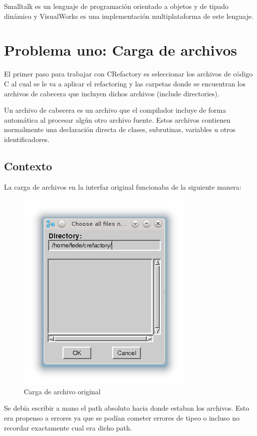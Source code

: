 \documentclass[a4paper,oneside,12pt]{article}
\begin{document}
Smalltalk es un lenguaje de programaci\'on orientado a objetos y de tipado din\'amico y VisualWorks es una implementaci\'on multiplataforma de este lenguaje.

\section{Problema uno: Carga de archivos}

El primer paso para trabajar con CRefactory es seleccionar los archivos de c\'odigo C al cual se le va a aplicar el refactoring y las carpetas donde se encuentran los archivos de cabecera que incluyen dichos archivos (include directories).

Un archivo de cabecera es un archivo que el compilador incluye de forma automática al procesar algún otro archivo fuente. Estos archivos contienen normalmente una declaración directa de clases, subrutinas, variables u otros identificadores.

\subsection{Contexto}
La carga de archivos en la interfaz original funcionaba de la siguiente manera:

\begin{figure}[h!]
  \centering
    \includegraphics[scale=0.85]{images/codigo_original/carga.png}
    \caption{Carga de archivo original}
\end{figure}

Se deb\'ia escribir a mano el path absoluto hacia donde estaban los archivos. Esto era propenso a errores ya que se podían cometer errores de tipeo o incluso no recordar exactamente cual era dicho path.
\end{document}
